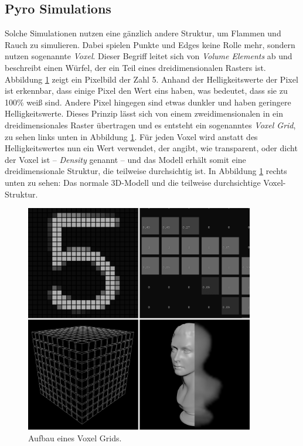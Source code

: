 \subsection{Pyro Simulations} 
Solche Simulationen nutzen eine gänzlich andere Struktur, um Flammen und Rauch zu simulieren. Dabei spielen Punkte und Edges keine Rolle mehr, sondern nutzen sogenannte \textit{Voxel}. Dieser Begriff leitet sich von \textit{Volume Elements} \parencite[S. 549]{FoleyDamEtAl90} ab und beschreibt einen Würfel, der ein Teil eines dreidimensionalen Rasters ist. Abbildung \ref{voxel} zeigt ein Pixelbild der Zahl 5. Anhand der Helligkeitswerte der Pixel ist erkennbar, dass einige Pixel den Wert eins haben, was bedeutet, dass sie zu 100\% weiß sind. Andere Pixel hingegen sind etwas dunkler und haben geringere Helligkeitswerte. Dieses Prinzip lässt sich von einem zweidimensionalen in ein dreidimensionales Raster übertragen und es entsteht ein sogenanntes \textit{Voxel Grid}, zu sehen links unten in Abbildung \ref{voxel}. Für jeden Voxel wird anstatt des Helligkeitswertes nun ein Wert verwendet, der angibt, wie transparent, oder dicht der Voxel ist – \textit{Density} genannt –  und das Modell erhält somit eine dreidimensionale Struktur, die teilweise durchsichtig ist. In Abbildung \ref{voxel} rechts unten zu sehen: Das normale 3D-Modell und die teilweise durchsichtige Voxel-Struktur. \\

\begin{figure}[ht]
    \centering
    \includegraphics[width=10cm]{bilder/voxel.jpg}
    \caption{Aufbau eines Voxel Grids.}
    \label{voxel}
\end{figure}

